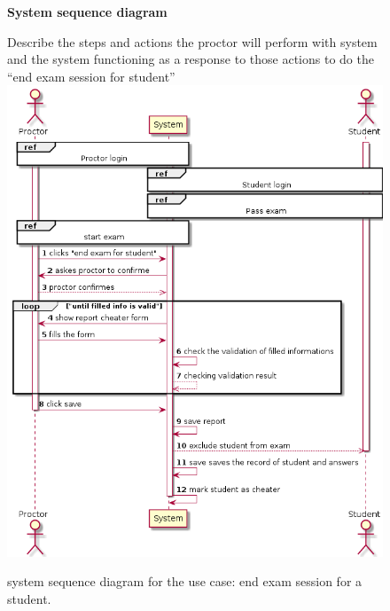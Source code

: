 \documentclass[]{uc2pfecaneva}
\begin{document}
    \begin{figure}[h]
        \raggedright\textbf{System sequence diagram}\linebreak
        \raggedright{Describe the steps and actions the proctor will perform with system and the system functioning
        as a response to those actions to do the “end exam session for student”}
        \includegraphics[width=\textwidth]{images/End_exam_for_student}
        \caption{system sequence diagram for the use case: end exam session for a student.}
    \end{figure}
    \clearpage
\end{document}
